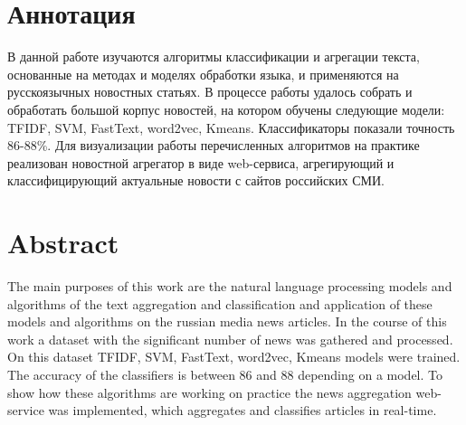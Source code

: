 \titleformat{\section}[block]
{\centering\fontsize{16pt}{18pt}\selectfont\bfseries}{\thesection\cftsecaftersnum}{0.5em}{} %
\section*{Аннотация}
В данной работе изучаются алгоритмы классификации и агрегации текста, основанные на
методах и моделях обработки языка, и применяются на русскоязычных новостных статьях.
В процессе работы удалось собрать и обработать большой корпус новостей, на котором
обучены следующие модели: TFIDF, SVM, FastText, word2vec, Kmeans. Классификаторы
показали точность 86-88\%. Для визуализации работы перечисленных алгоритмов на практике
реализован новостной агрегатор в виде web-сервиса, агрегирующий и классифицирующий актуальные
новости с сайтов российских СМИ. 

\section*{Abstract}
The main purposes of this work are the natural language processing models and algorithms of the text aggregation
and classification and application of these models and algorithms on the russian media news articles.
In the course of this work a dataset with the significant number of news was gathered and processed.
On this dataset TFIDF, SVM, FastText, word2vec, Kmeans models were trained. The accuracy of the classifiers
is between 86 and 88 depending on a model. To show how these algorithms are working on practice the news
aggregation web-service was implemented, which aggregates and classifies articles in real-time.

\titleformat{\section}[block]
{\raggedright\fontsize{16pt}{18pt}\selectfont\bfseries}{\thesection\cftsecaftersnum}{0.5em}{} %